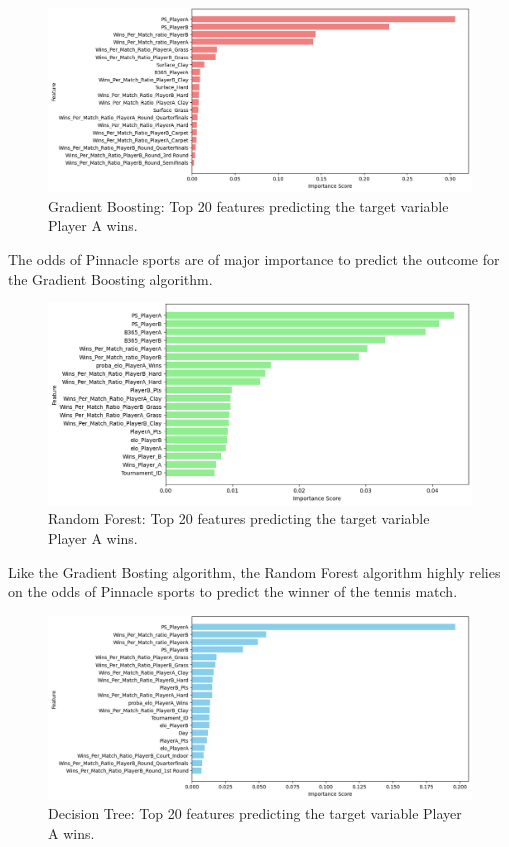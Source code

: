 \documentclass[preprint,aps,nofootinbib,a4paper,superscriptaddress,longbibliography,amsfonts,amssymb,amsmath,titlepage]{revtex4-2}
\begin{document}
%
\begin{figure}[h]
\includegraphics[width=\textwidth]{pictures/most-important-gb.png}
\caption{Gradient Boosting: Top 20 features predicting the target variable Player A wins.}
\label{most-important-gb}
\end{figure}
%
The odds of Pinnacle sports are of major importance to predict the outcome for the Gradient Boosting algorithm. 
%
\begin{figure}[h]
\includegraphics[width=\textwidth]{pictures/most-important-rf.png}
\caption{Random Forest: Top 20 features predicting the target variable Player A wins.}
\label{most-important-rf}
\end{figure}
%
Like the Gradient Bosting algorithm, the Random Forest algorithm highly relies on the odds of Pinnacle sports to predict the winner of the tennis match. 
%
\begin{figure}[h]
\includegraphics[width=\textwidth]{pictures/most-important-dt.png}
\caption{Decision Tree: Top 20 features predicting the target variable Player A wins.}
\label{most-important-df}
\end{figure}
\end{document}
